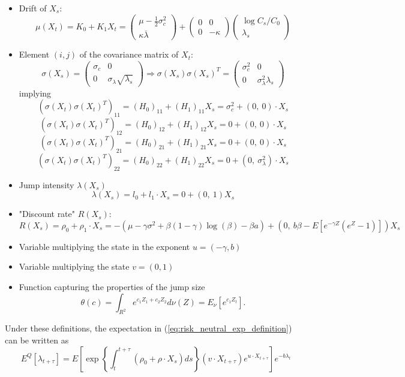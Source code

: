 \documentclass[11pt]{article}
\begin{document}
\begin{itemize}
    \item Drift of $X_s$: 
    \[\mu(X_t) = K_0 + K_1 X_t = \begin{pmatrix} \mu -\frac{1}{2}\sigma_c^2 \\ \kappa \overline{\lambda} \end{pmatrix} + \begin{pmatrix} 0 & 0 \\ 0 & -\kappa\end{pmatrix}\begin{pmatrix} \log C_s/C_0 \\ \lambda_s\end{pmatrix}\]
    \item Element $(i,j)$ of the covariance matrix of $X_t$:
    \[\sigma(X_s) = \begin{pmatrix} \sigma_c & 0 \\ 0 & \sigma_\lambda \sqrt{\lambda_s} \end{pmatrix} \Rightarrow \sigma(X_s)\sigma(X_s)^T = \begin{pmatrix} \sigma_c^2 & 0 \\ 0 & \sigma_\lambda^2\lambda_s\end{pmatrix}\]
    implying
    \[(\sigma(X_t)\sigma(X_t)^T)_{11} = (H_0)_{11} + (H_1)_{11}X_s = \sigma_c^2 + (0, \ 0)\cdot X_s\]
    \[(\sigma(X_t)\sigma(X_t)^T)_{12} = (H_0)_{12} + (H_1)_{12}X_s = 0 + (0, \ 0)\cdot X_s\]
    \[(\sigma(X_t)\sigma(X_t)^T)_{21} = (H_0)_{21} + (H_1)_{21}X_s = 0 + (0, \ 0)\cdot X_s\]
    \[(\sigma(X_t)\sigma(X_t)^T)_{22} = (H_0)_{22} + (H_1)_{22}X_s = 0 + (0, \ \sigma_\lambda^2)\cdot X_s\]
    \item Jump intensity $\lambda(X_s)$
    \[\lambda(X_s) = l_0 + l_1 \cdot X_s = 0 + (0, \ 1)X_s\]
    \item "Discount rate" $R(X_s)$: 
    \[R(X_s) = \rho_0 + \rho_1 \cdot X_s = -(\mu - \gamma\sigma^2 + \beta(1-\gamma)\log(\beta) - \beta a) + (0, \ b \beta - E\left[e^{-\gamma Z}(e^Z-1)\right])X_s\]
    \item Variable multiplying the state in the exponent $u = (-\gamma, b)$
    \item Variable multiplying the state $v = (0, 1)$
    \item Function capturing the properties of the jump size
    \[\theta(c) = \int_{R^2} e^{c_1 Z_1 + c_2 Z_2} d\nu(Z) = E_\nu[e^{c_1 Z_t}].\]
\end{itemize}
Under these definitions, the expectation in (\ref{eq:risk_neutral_exp_definition}) can be written as
\begin{equation}\label{eq:risk_neutral_exp_transform}
    E^Q\left[\lambda_{t+\tau}\right]
    =E\left[\exp\left\{\int_t^{t+\tau}(\rho_0 + \rho\cdot X_s)ds\right\}(v \cdot X_{t+\tau})e^{u\cdot X_{t+\tau}}\right] e^{-b\lambda_t}
\end{equation}
\end{document}
